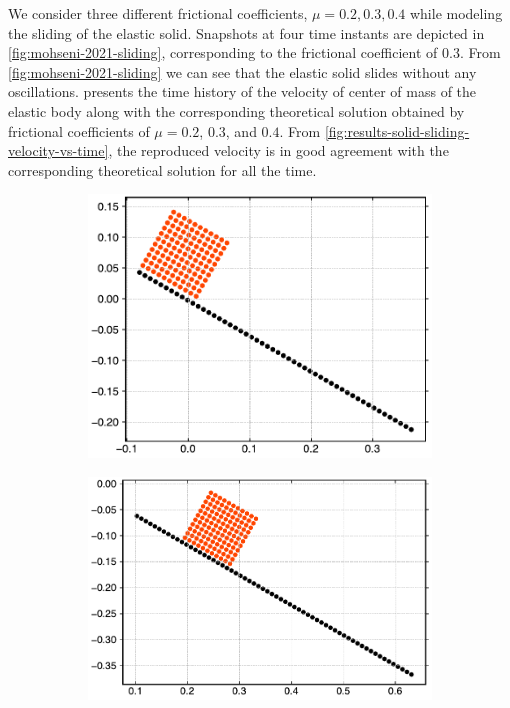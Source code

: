 We consider three different frictional coefficients, $\mu=0.2, 0.3, 0.4$ while
modeling the sliding of the elastic solid. Snapshots at four time instants are
depicted in \cref{fig:mohseni-2021-sliding}, corresponding to the frictional
coefficient of $0.3$. From \cref{fig:mohseni-2021-sliding} we can see that the
elastic solid slides without any oscillations.
 presents the time history of
the velocity of center of mass of the elastic body along with the
corresponding theoretical solution obtained by frictional coefficients of
$\mu=0.2$, $0.3$, and $0.4$. From
\cref{fig:results-solid-sliding-velocity-vs-time}, the reproduced velocity is
in good agreement with the corresponding theoretical solution for all the
time.
\begin{figure}[!htpb]
  \centering
  \begin{subfigure}{0.48\textwidth}
    \centering
    \includegraphics[width=1.0\textwidth]{figures/csph/figures/mohseni_2021_free_sliding_on_a_slope/fric_coeff_0_3/time0}
    \label{fig:passing-0}
  \end{subfigure}
  \begin{subfigure}{0.48\textwidth}
    \centering
    \includegraphics[width=1.0\textwidth]{figures/csph/figures/mohseni_2021_free_sliding_on_a_slope/fric_coeff_0_3/time1}
    \label{fig:passing-1}
  \end{subfigure}


\end{figure}
